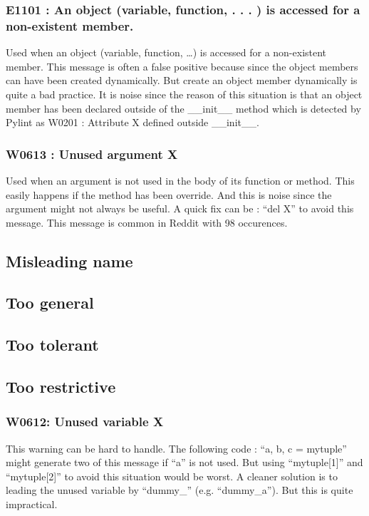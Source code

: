 \documentclass[11pt, a4paper]{article}
\newcommand{\pyl}{\textsf{Pylint}}
\begin{document}
\subsubsection*{E1101 : An object (variable, function, . . . ) is accessed for a non-existent member.}

Used when an object (variable, function, \dots{}) is accessed for a non-existent member.
This message is often a false positive because since the object members can have been created dynamically.
But create an object member dynamically is quite a bad practice.
It is noise since the reason of this situation is that an object member has been declared outside of the \_\_init\_\_ method which is detected by \pyl{} as W0201 : Attribute X defined outside \_\_init\_\_.

\subsubsection*{W0613 : Unused argument X}
Used when an argument is not used in the body of its function or method.
This easily happens if the method has been override.
And this is noise since the argument might not always be useful.
A quick fix can be : ``del X'' to avoid this message.
This message is common in Reddit with 98 occurences.

\subsection*{Misleading name}

\subsection*{Too general}

\subsection*{Too tolerant}

\subsection*{Too restrictive}

\subsubsection*{W0612: Unused variable X}

This warning can be hard to handle. 
The following code : ``a, b, c = mytuple'' might generate two of this message if ``a'' is not used.
But using ``mytuple[1]'' and ``mytuple[2]'' to avoid this situation would be worst.
A cleaner solution is to leading the unused variable by ``dummy\_'' (e.g. ``dummy\_a'').
But this is quite impractical.
\end{document}
